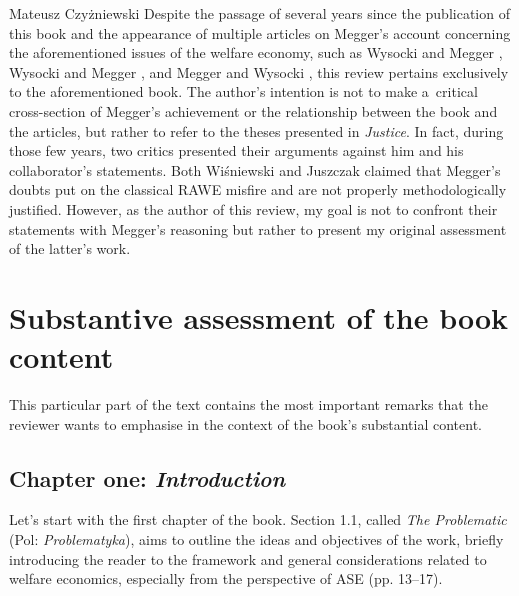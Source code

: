\begin{newrevengenv}{Mateusz Czyżniewski}
Despite the passage of several years since the publication of this book and the appearance of multiple articles on Megger's account concerning the aforementioned issues of the welfare economy, such as Wysocki and Megger 
\parencite*[][]{wysocki_austrian_2019}, %
 Wysocki and Megger 
\parencite*[][]{wysocki_rejoinder_2020}, %
 and Megger and Wysocki 
\parencite*[][]{megger_austriacka_2023}, %
 this review pertains exclusively to the aforementioned book. The author's intention is not to make a~critical cross-section of Megger's achievement or the relationship between the book and the articles, but rather to refer to the theses presented in \textit{Justice}. In fact, during those few years, two critics presented their arguments against him and his collaborator's statements. Both Wiśniewski 
\parencite*[][]{wisniewski_austrian_2019} %
 and Juszczak 
\parencite*[][]{juszczak_o_2021} %
 claimed that Megger's doubts put on the classical RAWE misfire and are not properly methodologically justified. However, as the author of this review, my goal is not to confront their statements with Megger's reasoning but rather to present my original assessment of the latter's work.



\section{Substantive assessment of the book content}

This particular part of the text contains the most important remarks that the reviewer wants to emphasise in the context of the book's substantial content.



\subsection{Chapter one: \textit{Introduction}}



Let's start with the first chapter of the book. Section 1.1, called \textit{The Problematic} (Pol: \textit{Problematyka}), aims to outline the ideas and objectives of the work, briefly introducing the reader to the framework and general considerations related to welfare economics, especially from the perspective of ASE (pp. 13–17).




\end{newrevengenv}
